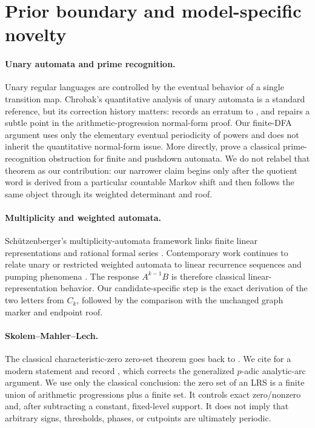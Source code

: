 \section{Prior boundary and model-specific novelty}
\label{sec:prior}

\paragraph{Unary automata and prime recognition.}
Unary regular languages are controlled by the eventual behavior of a single
transition map.  Chrobak's quantitative analysis of unary automata is a
standard reference, but its correction history matters:
\citet{Chrobak2003Erratum} records an erratum to
\citet{Chrobak1986}, and \citet{To2009} repairs a subtle point in the
arithmetic-progression normal-form proof.  Our finite-DFA argument uses only
the elementary eventual periodicity of powers and does not inherit the
quantitative normal-form issue.  More directly, \citet{HartmanisShank1968}
prove a classical prime-recognition obstruction for finite and pushdown
automata.  We do not relabel that theorem as our contribution: our narrower
claim begins only after the quotient word is derived from a particular
countable Markov shift and then follows the same object through its weighted
determinant and roof.

\paragraph{Multiplicity and weighted automata.}
Sch{\"u}tzenberger's multiplicity-automata framework links finite linear
representations and rational formal series
\citep{Schutzenberger1961}.  Contemporary work continues to relate unary or
restricted weighted automata to linear recurrence sequences and pumping
phenomena \citep{BarloyEtAl2020,MazowieckiPuchSmertnig2026}.  The response
\(A^{k-1}B\) is therefore classical linear-representation behavior.  Our
candidate-specific step is the exact derivation of the two letters from
\(C_k\), followed by the comparison with the unchanged graph marker and
endpoint roof.

\paragraph{Skolem--Mahler--Lech.}
The classical characteristic-zero zero-set theorem goes back to
\citet{Lech1953}.  We cite \citet{Bell2006} for a modern statement and
record \citet{Bell2008Corrigendum}, which corrects the generalized
\(p\)-adic analytic-arc argument.  We use only the classical conclusion:
the zero set of an LRS is a finite union of arithmetic progressions plus a
finite set.  It controls exact zero/nonzero and, after subtracting a
constant, fixed-level support.  It does not imply that arbitrary signs,
thresholds, phases, or cutpoints are ultimately periodic.

